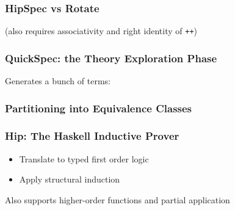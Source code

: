 \documentclass[serif,professionalfont]{beamer}
\newcommand\dn[0]{\vspace{\baselineskip}}
\newcommand\hs[1]{\texttt{#1}}
\begin{document}


\begin{frame}
    \frametitle{HipSpec vs Rotate}

    \rotategen

    \pause
    \begin{center}
    (also requires associativity and right identity of \hs{++})
    \end{center}

\end{frame}

\begin{comment} %
  Prove properties of functional programs using rewriting and
  induction.

  {\color{Purpleee} Problem:} Som properties require lemmas to be proved, that

  \begin{itemize}
    \item Needs to be conjectured,
    \item Requires induction to be proved, and
    \item Might require lemmas themselves
  \end{itemize}
\end{comment}


\begin{frame}
    \frametitle{QuickSpec: the Theory Exploration Phase}
    Generates a bunch of terms: %
    \dn
    
\end{frame}

\begin{frame}
    \frametitle{Partitioning into Equivalence Classes}

    


\end{frame}

\begin{frame}[fragile]
  \frametitle{Hip: The Haskell Inductive Prover}

  \begin{itemize}
    \item Translate to typed first order logic
    \item Apply structural induction
  \end{itemize}

  Also supports higher-order functions and partial application
\end{frame}
\end{document}
